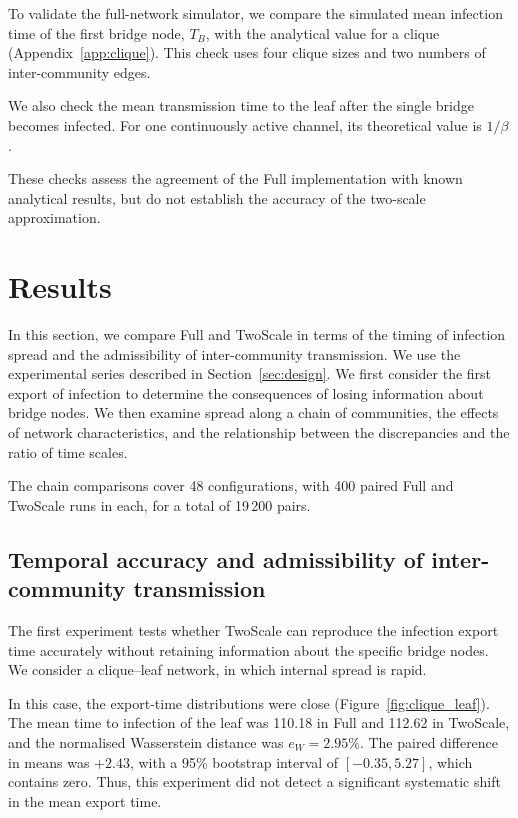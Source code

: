 \documentclass{ieeeaccess}
\newcommand{\Full}{\textup{Full}}
\newcommand{\TS}{\textup{TwoScale}}
\newcommand{\eW}{e_{W}}
\begin{document}
To validate the full-network simulator, we compare the simulated mean infection time of the first bridge node, $T_B$, with the analytical value for a clique (Appendix~\ref*{app:clique}). This check uses four clique sizes and two numbers of inter-community edges.

We also check the mean transmission time to the leaf after the single bridge becomes infected. For one continuously active channel, its theoretical value is $1/\beta$.

These checks assess the agreement of the \Full{} implementation with known analytical results, but do not establish the accuracy of the two-scale approximation.

\section{Results}
\label{sec:results}

In this section, we compare \Full{} and \TS{} in terms of the timing of infection spread and the admissibility of inter-community transmission. We use the experimental series described in Section~\ref{sec:design}. We first consider the first export of infection to determine the consequences of losing information about bridge nodes. We then examine spread along a chain of communities, the effects of network characteristics, and the relationship between the discrepancies and the ratio of time scales.

The chain comparisons cover 48 configurations, with 400 paired \Full{} and \TS{} runs in each, for a total of 19\,200 pairs.

\subsection{Temporal accuracy and admissibility of inter-community transmission}
\label{sec:res_clique}

The first experiment tests whether \TS{} can reproduce the infection export time accurately without retaining information about the specific bridge nodes. We consider a clique--leaf network, in which internal spread is rapid.

In this case, the export-time distributions were close (Figure~\ref{fig:clique_leaf}). The mean time to infection of the leaf was 110.18 in \Full{} and 112.62 in \TS{}, and the normalised Wasserstein distance was $\eW=2.95\%$. The paired difference in means was $+2.43$, with a 95\% bootstrap interval of $[-0.35,5.27]$, which contains zero. Thus, this experiment did not detect a significant systematic shift in the mean export time.
\end{document}
